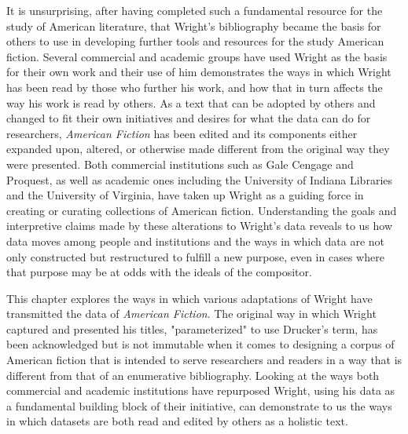 It is unsurprising, after having completed such a fundamental resource for the study of American literature, that Wright's bibliography became the basis for others to use in developing further tools and resources for the study American fiction. Several commercial and academic groups have used Wright as the basis for their own work and their use of him demonstrates the ways in which Wright has been read by those who further his work, and how that in turn affects the way his work is read by others. As a text that can be adopted by others and changed to fit their own initiatives and desires for what the data can do for researchers, \textit{American Fiction} has been edited and its components either expanded upon, altered, or otherwise made different from the original way they were presented. Both commercial institutions such as Gale Cengage and Proquest, as well as academic ones including the University of Indiana Libraries and the University of Virginia, have taken up Wright as a guiding force in creating or curating collections of American fiction. Understanding the goals and interpretive claims made by these alterations to Wright's data reveals to us how data moves among people and institutions and the ways in which data are not only constructed but restructured to fulfill a new purpose, even in cases where that purpose may be at odds with the ideals of the compositor. 

This chapter explores the ways in which various adaptations of Wright have transmitted the data of \textit{American Fiction}. The original way in which Wright captured and presented his titles, "parameterized" to use Drucker's term, has been acknowledged but is not immutable when it comes to designing a corpus of American fiction that is intended to serve researchers and readers in a way that is different from that of an enumerative bibliography. Looking at the ways both commercial and academic institutions have repurposed Wright, using his data as a fundamental building block of their initiative, can demonstrate to us the ways in which datasets are both read and edited by others as a holistic text. 

